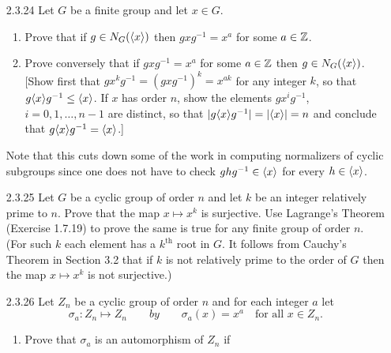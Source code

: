 \begin{enumerate}
   \item[2.3.24]  Let $G$ be a finite group and let $x \in G$.
                  \begin{enumerate}
                     \item Prove that if $g \in N_G(\langle x \rangle)$ then
                           $gxg^{-1} = x^a$ for some $a \in \mathbb{Z}$. 
                     \item Prove conversely that if $gxg^{-1} = x^a$ for some
                           $a \in \mathbb{Z}$ then $g \in N_G(\langle x \rangle)$. [Show first
                           that $gx^kg^{-1} = (gxg^{-1})^k = x^{ak}$ for any
                           integer $k$, so that $g\langle x \rangle g^{-1} \le \langle x \rangle$.
                           If $x$ has order $n$, show the elements $gx^ig^{-1}$,
                           $i = 0, 1, \ldots, n-1$ are distinct, so that
                           $|g\langle x \rangle g^{-1}| = |\langle x \rangle| = n$ and conclude that
                           $g\langle x \rangle g^{-1} = \langle x \rangle$.]
                  \end{enumerate}
                  Note that this cuts down some of the work in computing
                  normalizers of cyclic subgroups since one does not have to
                  check $ghg^{-1} \in \langle x \rangle$ for every $h \in \langle x \rangle$.
   \item[2.3.25]  Let $G$ be a cyclic group of order $n$ and let $k$ be an
                  integer relatively prime to $n$. Prove that the map
                  $x \mapsto x^k$ is surjective. Use Lagrange's Theorem
                  (Exercise 1.7.19) to prove the same is true for any finite
                  group of order $n$. (For such $k$ each element has a
                  $k^{\text{th}}$ root in $G$. It follows from Cauchy's Theorem
                  in Section 3.2 that if $k$ is not relatively prime to the
                  order of $G$ then the map $x \mapsto x^k$ is not surjective.)
   \item[2.3.26]  Let $Z_n$ be a cyclic group of order $n$ and for each integer
                  $a$ let
                  $$\sigma_a : Z_n \mapsto Z_n \qquad by \qquad \sigma_a(x) =
                  x^a \quad \text{for all } x \in Z_n.$$
                  \begin{enumerate}
                     \item Prove that $\sigma_a$ is an automorphism of $Z_n$ if

\end{enumerate}
\end{enumerate}

